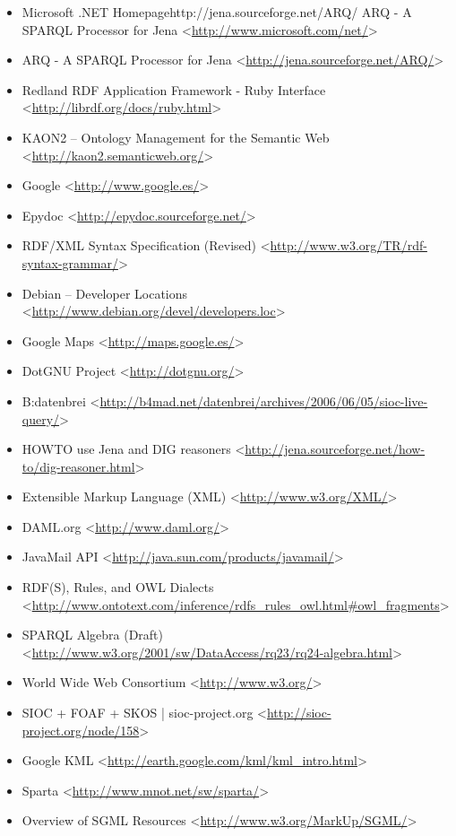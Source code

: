 \begin{itemize}
 \item Microsoft .NET Homepagehttp://jena.sourceforge.net/ARQ/ ARQ - A SPARQL Processor for Jena
 <\url{http://www.microsoft.com/net/}>
 \item ARQ - A SPARQL Processor for Jena
 <\url{http://jena.sourceforge.net/ARQ/}>
 \item Redland RDF Application Framework - Ruby Interface
 <\url{http://librdf.org/docs/ruby.html}>
 \item KAON2 -- Ontology Management for the Semantic Web
 <\url{http://kaon2.semanticweb.org/}>
 \item Google
 <\url{http://www.google.es/}>
 \item Epydoc
 <\url{http://epydoc.sourceforge.net/}>
 \item RDF/XML Syntax Specification (Revised)
 <\url{http://www.w3.org/TR/rdf-syntax-grammar/}>
 \item Debian -- Developer Locations
 <\url{http://www.debian.org/devel/developers.loc}>
 \item Google Maps
 <\url{http://maps.google.es/}>
 \item DotGNU Project
 <\url{http://dotgnu.org/}>
 \item B:datenbrei
 <\url{http://b4mad.net/datenbrei/archives/2006/06/05/sioc-live-query/}>
 \item HOWTO use Jena and DIG reasoners
 <\url{http://jena.sourceforge.net/how-to/dig-reasoner.html}>
 \item Extensible Markup Language (XML)
 <\url{http://www.w3.org/XML/}>
 \item DAML.org
 <\url{http://www.daml.org/}>
 \item JavaMail API
 <\url{http://java.sun.com/products/javamail/}>
 \item RDF(S), Rules, and OWL Dialects
 <\url{http://www.ontotext.com/inference/rdfs_rules_owl.html\#owl_fragments}>
 \item SPARQL Algebra (Draft)
 <\url{http://www.w3.org/2001/sw/DataAccess/rq23/rq24-algebra.html}>
 \item World Wide Web Consortium
 <\url{http://www.w3.org/}>
 \item SIOC + FOAF + SKOS | sioc-project.org
 <\url{http://sioc-project.org/node/158}>
 \item Google KML
 <\url{http://earth.google.com/kml/kml_intro.html}>
 \item Sparta
 <\url{http://www.mnot.net/sw/sparta/}>
 \item Overview of SGML Resources
 <\url{http://www.w3.org/MarkUp/SGML/}>

\end{itemize}
